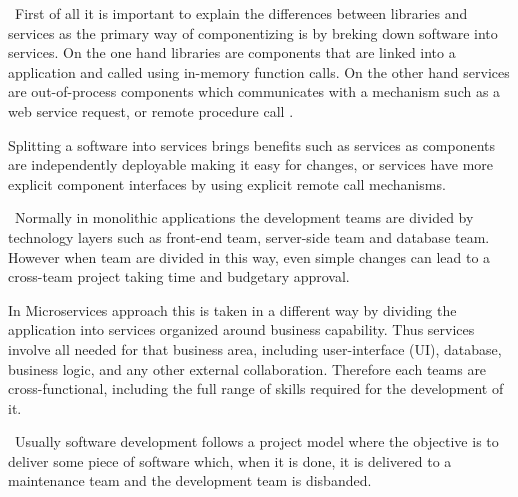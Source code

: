 \begin{description}[style=nextline]
\item[Componentization via Services] \hfill \
First of all it is important to explain the differences between libraries and services as the primary way of componentizing is by breking down software into services. On the one hand libraries are components that are linked into a application and called using in-memory function calls. On the other hand services are out-of-process components which communicates with a mechanism such as a web service request, or remote procedure call \cite{Fowler2014}.

Splitting a software into services brings benefits such as services as components are independently deployable making it easy for changes, or services have more explicit component interfaces by using explicit remote call mechanisms. 
\item[Organized around Business Capabilities] \hfill \
Normally in monolithic applications the development teams are divided by technology layers such as front-end team, server-side team and database team. However when team are divided in this way, even simple changes can lead to a cross-team project taking time and budgetary approval.

In Microservices approach this is taken in a different way by dividing the application into services organized around business capability. Thus services involve all needed for that business area, including user-interface (UI), database, business logic, and any other external collaboration. Therefore each teams are cross-functional, including the full range of skills required for the development of it.
\item[Products not Projects] \hfill \
Usually software development follows a project model where the objective is to deliver some piece of software which, when it is done, it is delivered to a maintenance team and the development team is disbanded.


\end{description}
